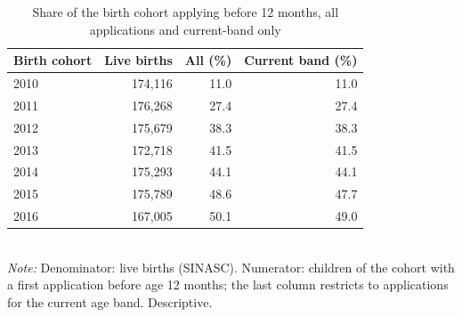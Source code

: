 \begin{table}[htbp]\centering
\caption{Share of the birth cohort applying before 12 months, all applications and current-band only}
\label{tab:A5_faixa_corrente}
\small
\setlength{\tabcolsep}{4pt}
\begin{tabular}{lrrr}
\toprule
Birth cohort & Live births & All (\%) & Current band (\%) \\
\midrule
2010 & 174,116 & 11.0 & 11.0 \\
2011 & 176,268 & 27.4 & 27.4 \\
2012 & 175,679 & 38.3 & 38.3 \\
2013 & 172,718 & 41.5 & 41.5 \\
2014 & 175,293 & 44.1 & 44.1 \\
2015 & 175,789 & 48.6 & 47.7 \\
2016 & 167,005 & 50.1 & 49.0 \\
\bottomrule
\end{tabular}
\\[3pt]{\footnotesize \textit{Note:} Denominator: live births (SINASC). Numerator: children of the cohort with a first application before age 12 months; the last column restricts to applications for the current age band. Descriptive.}
\end{table}
